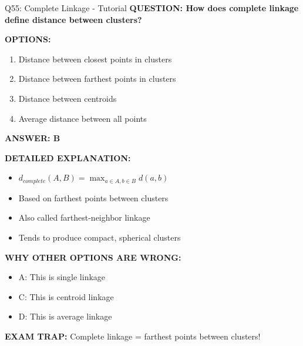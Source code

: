 \documentclass[8pt]{beamer}
\begin{document}
	\begin{frame}{Q55: Complete Linkage - Tutorial}
		\fontsize{6.5}{7.5}\selectfont
		\textbf{QUESTION: How does complete linkage define distance between clusters?}
		
		\vspace{0.1cm}
		\textbf{OPTIONS:}
		\begin{enumerate}
			\item Distance between closest points in clusters
			\item Distance between farthest points in clusters
			\item Distance between centroids
			\item Average distance between all points
		\end{enumerate}
		
		\vspace{0.1cm}
		\textcolor{myblue}{\textbf{ANSWER: B}}
		
		\vspace{0.1cm}
		\textbf{DETAILED EXPLANATION:}
		\begin{itemize}
			\item $d_{complete}(A,B) = \max_{a \in A, b \in B} d(a,b)$
			\item Based on farthest points between clusters
			\item Also called farthest-neighbor linkage
			\item Tends to produce compact, spherical clusters
		\end{itemize}
		
		\vspace{0.1cm}
		\textcolor{myred}{\textbf{WHY OTHER OPTIONS ARE WRONG:}}
		\begin{itemize}
			\item \textcolor{myred}{A:} This is single linkage
			\item \textcolor{myred}{C:} This is centroid linkage
			\item \textcolor{myred}{D:} This is average linkage
		\end{itemize}
		
		\textcolor{myred}{\textbf{EXAM TRAP:}} Complete linkage = \textcolor{myblue}{farthest points between clusters}!
	\end{frame}
	
\end{document}
